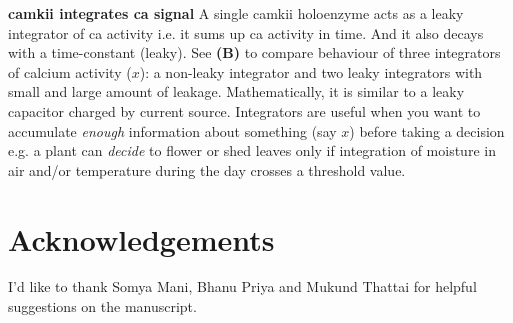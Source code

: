 \documentclass[]{resonance}
\begin{document}
{    \textbf{\gls{camkii} integrates \gls{ca} signal} A single \gls{camkii}
    holoenzyme acts as a leaky integrator of \gls{ca} activity i.e. it sums up
    \gls{ca} activity in time. And it also decays with a time-constant (leaky).
    See \textbf{(B)} to compare behaviour of three integrators of calcium
    activity ($x$): a non-leaky integrator and two leaky integrators with small
    and large amount of leakage. Mathematically, it is similar to a leaky
    capacitor charged by current source. Integrators are useful when you want to
    accumulate \emph{enough} information about something (say $x$) before taking
    a decision e.g.  a plant can \emph{decide} to flower or shed leaves only if
    integration of moisture in air and/or temperature during the day crosses a
    threshold value.
} %

\section*{Acknowledgements} I'd like to thank Somya Mani, Bhanu Priya and Mukund
Thattai for helpful suggestions on the manuscript. 

\end{document}
